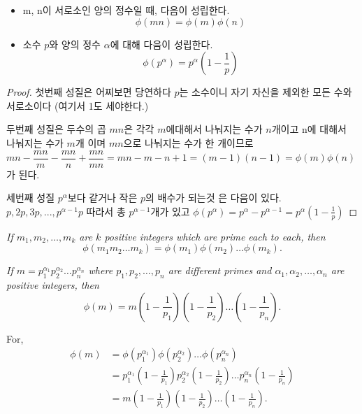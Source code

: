 {\begin{theorem}
\begin{itemize}
        \item{ m, n이 서로소인 양의 정수일 때, 다음이 성립한다. \[\phi (mn)=\phi (m)\phi (n)\]}
        
        \item 소수 $p$와 양의 정수 $\alpha$에 대해 다음이 성립한다.
        $$\phi(p^\alpha) = p^\alpha \left ( 1 - \frac{1}{p} \right )$$
        \end{itemize}
\end{theorem}

\begin{proof}

첫번째 성질은 어찌보면 당연하다 $p$는 소수이니 자기 자신을 제외한 모든 수와 서로소이다 (여기서 1도 세야한다.)


두번째 성질은 두수의 곱 $mn$은 각각 $m$에대해서 나눠지는 수가 $n$개이고 n에 대해서 나눠지는 수가 $m$개 이며 $mn$으로 나눠지는 수가 한 개이므로 
$mn -\dfrac{mn}{m}-\dfrac{mn}{n}+\dfrac{mn}{mn} =mn -m -n +1=(m-1)(n-1)=\phi (m)\phi(n)$가 된다.

세번째 성질 $p^\alpha$보다 같거나 작은 $p$의 배수가 되는것 은 다음이 있다.
$p , 2p , 3p , ... , p^{\alpha-1}p$
따라서 총 $p^{\alpha-1}$개가 있고 
$ \phi(p^\alpha) =p^{\alpha} -  p^{\alpha-1} = p^\alpha \left ( 1 - \frac{1}{p} \right )$

\end{proof}

\begin{corollary}
    \emph{If $m_1, m_2, \ldots, m_k$ are $k$ positive
    integers which are prime each to each, then}
    \begin{equation*}
    \phi(m_1 m_2 \ldots m_k) = \phi(m_1) \phi(m_2) \ldots \phi(m_k).
    \end{equation*}
\end{corollary}


\emph{If $m = p_1^{\alpha_1} p_2^{\alpha_2} \ldots p_n^{\alpha_n}$
where $p_1, p_2, \ldots, p_n$ are different primes and $\alpha_1,
\alpha_2, \ldots, \alpha_n$ are positive integers, then}
\begin{equation*}
\phi(m) = m \left ( 1-\frac{1}{p_1} \right )
            \left ( 1-\frac{1}{p_2} \right )
            \ldots
            \left ( 1-\frac{1}{p_n} \right ).
\end{equation*}

For,
\begin{align*}
\phi(m) &= \phi(p_1^{\alpha_1}) \phi(p_2^{\alpha_2}) \ldots
             \phi(p_n^{\alpha_n}) \\
        &= p_1^{\alpha_1} \left ( 1-\frac{1}{p_1} \right )
             p_2^{\alpha_2} \left ( 1-\frac{1}{p_2} \right )
             \ldots
             p_n^{\alpha_n} \left ( 1-\frac{1}{p_n} \right ) \\
        &= m \left ( 1-\frac{1}{p_1} \right )
             \left ( 1-\frac{1}{p_2} \right )
             \ldots
             \left ( 1-\frac{1}{p_n} \right ).
\end{align*}



}
